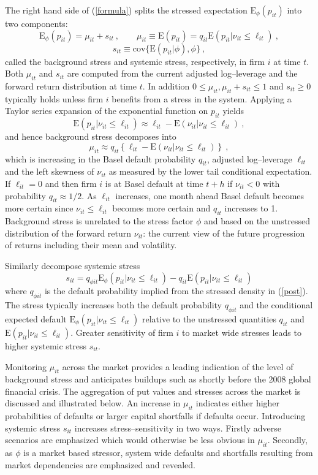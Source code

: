 \documentclass[12pt]{article}
\newcommand{\E}{\mathrm{E}}
\newcommand{\cov}{\mathrm{cov}}
\newcommand{\Es}{\E_\phi}
\newcommand{\eref}[1]{(\ref{#1})}
\newcommand{\cq}{\ , \qquad}
\newcommand{\be}[1]{\begin{equation}\label{#1}}
\newcommand{\ee}{\end{equation}}
\begin{document}
The right hand side of \eref{formula} splits the stressed expectation $\Es(p_{it})$ into two components:
\be{vsstress}
\Es(p_{it}) =\mu_{it}+s_{it}\cq
 \mu_{it} \equiv \E(p_{it})=q_{it}\E(p_{it}|\nu_{it}\le \ell_{it}) \ ,
\ee
$$
s_{it} \equiv \cov\{\E(p_{it}|\phi),\phi\}\ ,
$$
called  the background stress  and systemic stress, respectively, in firm $i$ at time $t$. Both $\mu_{it}$ and $s_{it}$ are computed from the current adjusted log--leverage and the forward return distribution at time $t$. In addition $0\le \mu_{it},\mu_{it}+s_{it}\le 1$ and $s_{it}\ge 0$ typically holds unless firm $i$ benefits from a stress in the system. Applying a Taylor series expansion of the exponential function on $p_{it}$ yields
$$
\E(p_{it}|\nu_{it}\le \ell_{it}) \approx \ell_{it}-\E(\nu_{it}|\nu_{it}\le \ell_{it})\ ,
$$
and hence background stress decomposes into
$$
\mu_{it} \approx q_{it} \left\{\ell_{it} - \E(\nu_{it}|\nu_{it}\le \ell_{it})\right\} \ ,
$$
which is increasing in the Basel default probability $q_{it}$, adjusted log--leverage $\ell_{it}$ and the left skewness of $\nu_{it}$ as measured by the lower tail conditional expectation. If $\ell_{it}=0$  and then firm $i$ is at Basel default at time $t+h$ if  $\nu_{it}<0$ with probability $q_{it}\approx 1/2$. As  $\ell_{it}$ increases,  one month ahead Basel default becomes more certain since $\nu_{it}\le \ell_{it}$ becomes more certain and $q_{it}$ increases to 1. Background stress is unrelated to the stress factor $\phi$ and based on the unstressed distribution of the forward return $\nu_{it}$: the current view of the future progression of returns including their mean and volatility.

Similarly decompose systemic stress
$$
s_{it} = q_{\phi it}\E_\phi(p_{it}|\nu_{it}\le \ell_{it})-q_{it}\E(p_{it}|\nu_{it} \le \ell_{it})
$$
where $q_{\phi it}$ is the default probability implied from the stressed density in \eref{post}. The stress typically increases both the default probability  $q_{\phi it}$ and the conditional expected default $\E_\phi(p_{it}|\nu_{it}\le \ell_{it})$ relative to the unstressed quantities $q_{it}$ and $\E(p_{it}|\nu_{it} \le \ell_{it})$. Greater sensitivity of firm $i$ to market wide stresses leads to higher systemic stress $s_{it}$.

Monitoring $\mu_{it}$ across the market provides a leading indication of the level of background stress and anticipates buildups such as shortly before the 2008 global financial crisis. The aggregation of put values and stresses across the market is discussed and illustrated below. An increase in $\mu_{it}$ indicates either higher probabilities of defaults or larger capital shortfalls if defaults occur. Introducing systemic stress $s_{it}$ increases stress--sensitivity in two ways. Firstly adverse scenarios are emphasized which would otherwise be less obvious in $\mu_{it}$. Secondly, as $\phi$ is a market based stressor, system wide defaults and shortfalls resulting from market dependencies are emphasized and revealed.
\end{document}
